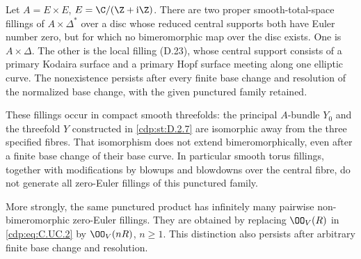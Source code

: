 \begin{proposition}\label{cdp:st:C.2.UN.3}

Let $A=E\times E$, $E=\C/(\Z+\mathrm i\Z)$.
There are two proper smooth-total-space fillings of
$A\times\Delta^*$ over a disc whose reduced central
supports both have Euler number zero, but for which
no bimeromorphic map over the disc exists. One is
$A\times\Delta$. The other is the local filling
(D.23), whose central support consists of a primary
Kodaira surface and a primary Hopf surface meeting
along one elliptic curve. The nonexistence persists
after every finite base change and resolution of the
normalized base change, with the given punctured
family retained.

These fillings occur in compact smooth threefolds:
the principal $A$-bundle $Y_0$ and the threefold $Y$
constructed in \ref{cdp:st:D.2.7} are isomorphic away from the
three specified fibres. That isomorphism does not
extend bimeromorphically, even after a finite base
change of their base curve. In particular smooth
torus fillings, together with modifications by
blowups and blowdowns over the central fibre, do
not generate all zero-Euler fillings of this
punctured family.

More strongly, the same punctured product has
infinitely many pairwise non-bimeromorphic
zero-Euler fillings. They are obtained by replacing
$\OO_V(R)$ in \eqref{cdp:eq:C.UC.2} by $\OO_V(nR)$,
$n\ge1$. This distinction also persists after
arbitrary finite base change and resolution.
\end{proposition}

